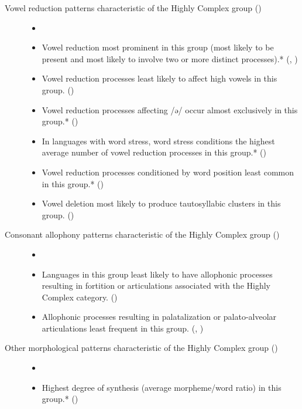 \begin{description}
\item[Vowel reduction patterns characteristic of the Highly Complex group ()]

\begin{itemize}[leftmargin=*]
\item[]
\item Vowel reduction most prominent in this group (most likely to be present and most likely to involve two or more distinct processes).* {(, )}
\item Vowel reduction processes least likely to affect high vowels in this group. {()}
\item Vowel reduction processes affecting /ə/ occur almost exclusively in this group.* ()
\item In languages with word stress, word stress conditions the highest average number of vowel reduction processes in this group.* ()
\item Vowel reduction processes conditioned by word position least common in this group.* ()
\item Vowel deletion most likely to produce tautosyllabic clusters in this group. ()
\end{itemize}

\item[Consonant allophony patterns characteristic of the Highly Complex group ()]

\begin{itemize}[leftmargin=*]
\item[]
\item Languages in this group least likely to have allophonic processes resulting in fortition or articulations associated with the Highly Complex category. ()
\item Allophonic processes resulting in palatalization or palato-alveolar articulations least frequent in this group. {(, )}
\end{itemize}

\item[Other morphological patterns characteristic of the Highly Complex group ()]

\begin{itemize}[leftmargin=*]
\item[]
\item Highest degree of synthesis (average morpheme/word ratio) in this group.* {()}
\end{itemize}
\end{description}

